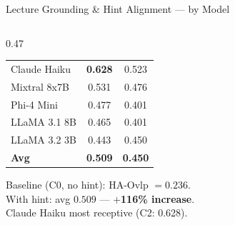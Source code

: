 \documentclass[aspectratio=169]{beamer}
\begin{document}
\begin{frame}{Lecture Grounding \& Hint Alignment --- by Model}
\begin{columns}[T]
\begin{column}{0.47\textwidth}
\begin{center}
\begin{tabular}{lcc}
      \midrule
      Claude Haiku  & \cellcolor{custompurple!20}\textbf{0.628} & \cellcolor{custompurple!15}0.523\\
      Mixtral 8x7B  & \cellcolor{custompurple!15}0.531 & 0.476\\
      Phi-4 Mini    & 0.477 & 0.401\\
      LLaMA 3.1 8B  & 0.465 & 0.401\\
      LLaMA 3.2 3B  & 0.443 & 0.450\\
      \midrule
      \textbf{Avg}  & \textbf{0.509} & \textbf{0.450}\\
      \bottomrule
    \end{tabular}
    \end{center}
    \vspace{0.05cm}
    {\footnotesize Baseline (C0, no hint): HA-Ovlp $= 0.236$.\\
    With hint: avg $0.509$ --- \textbf{$+$116\% increase}.\\
    Claude Haiku most receptive (C2: 0.628).}
  \end{column}
\end{columns}
\end{frame}
\end{document}
